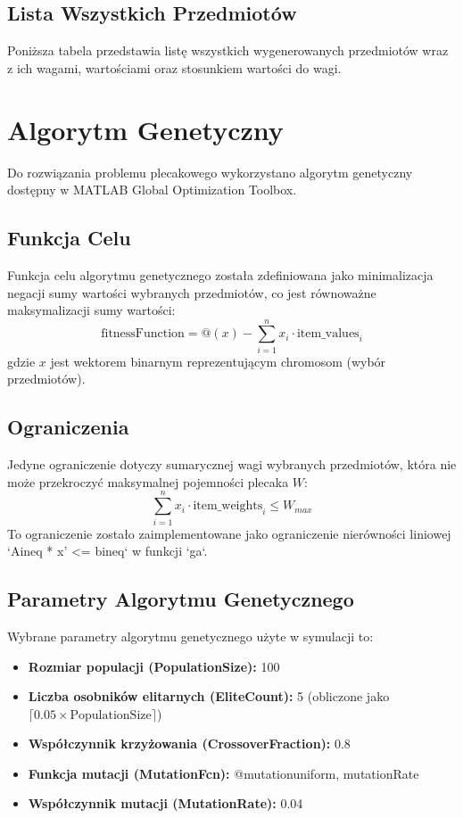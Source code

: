 \documentclass[a4paper, 11pt]{article}
\begin{document}
\subsection{Lista Wszystkich Przedmiotów}
Poniższa tabela przedstawia listę wszystkich wygenerowanych przedmiotów wraz z ich wagami, wartościami oraz stosunkiem wartości do wagi.


\newpage
\section{Algorytm Genetyczny}
Do rozwiązania problemu plecakowego wykorzystano algorytm genetyczny dostępny w MATLAB Global Optimization Toolbox.

\subsection{Funkcja Celu}
Funkcja celu algorytmu genetycznego została zdefiniowana jako minimalizacja negacji sumy wartości wybranych przedmiotów, co jest równoważne maksymalizacji sumy wartości:
\[ \text{fitnessFunction} = @(x) -\sum_{i=1}^{n} x_i \cdot \text{item\_values}_i \]
gdzie $x$ jest wektorem binarnym reprezentującym chromosom (wybór przedmiotów).

\subsection{Ograniczenia}
Jedyne ograniczenie dotyczy sumarycznej wagi wybranych przedmiotów, która nie może przekroczyć maksymalnej pojemności plecaka $W$:
\[ \sum_{i=1}^{n} x_i \cdot \text{item\_weights}_i \leq W_{max} \]
To ograniczenie zostało zaimplementowane jako ograniczenie nierówności liniowej `Aineq * x' <= bineq` w funkcji `ga`.

\subsection{Parametry Algorytmu Genetycznego}
Wybrane parametry algorytmu genetycznego użyte w symulacji to:
\begin{itemize}
    \item \textbf{Rozmiar populacji (PopulationSize):} 100
    \item \textbf{Liczba osobników elitarnych (EliteCount):} 5 (obliczone jako $\lceil 0.05 \times \text{PopulationSize} \rceil$)
    \item \textbf{Współczynnik krzyżowania (CrossoverFraction):} 0.8
    \item \textbf{Funkcja mutacji (MutationFcn):} {@mutationuniform, mutationRate}
    \item \textbf{Współczynnik mutacji (MutationRate):} 0.04
\end{itemize}
\end{document}
